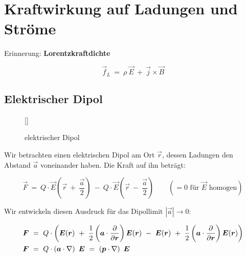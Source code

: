 \chapter{Kraftwirkung auf Ladungen und Ströme}

Erinnerung: \textbf{Lorentzkraftdichte}

\begin{equation*}
\vec{f}_L \ = \ \rho \ \vec{E} \ + \ \vec{j}\times\vec{B}
\end{equation*}

\section{Elektrischer Dipol}
\begin{wrapfigure}[12]{l}[0cm]{0cm}
	\raisebox{0pt}[\dimexpr{}\baselineskip\relax]{
		\colorbox{hgrey}{
		}
	}
	\caption{elektrischer Dipol}
\end{wrapfigure}
Wir betrachten einen elektrischen Dipol am Ort $\vec{r}$, dessen Ladungen den Abstand $\vec{a}$ voneinander haben. Die Kraft auf ihn beträgt:

\begin{equation*}
\vec{F} \ = \ Q \cdot \vec{E}\left(\vec{r} \ + \ \frac{\vec{a}}{2}\right) \ - \ Q \cdot\vec{E} \left(\vec{r} \ - \ \frac{\vec{a}}{2}\right) \qquad (=0 \text{ für $\vec{E}$ homogen})
\end{equation*}

Wir entwickeln diesen Ausdruck für das Dipollimit $|\vec{a}| \rightarrow 0$:

\begin{align*}
\vec{F}  \ &= \ Q \cdot \left( \vec{E} (\vec{r}) \ + \ \frac{1}{2} \left(\vec{a}\cdot\pdiff{}{\vec{r}}\right) \vec{E}(\vec{r}) \ - \ \vec{E}(\vec{r}) \ + \ \frac{1}{2} \left(\vec{a}\cdot\pdiff{}{\vec{r}}\right)\vec{E}(\vec{r})\right) \\
\vec{F} \ &= \ Q\cdot \left(\vec{a}\cdot\nabla\right) \ \vec{E}  \ = \ \left( \vec{p} \cdot \nabla\right) \ \vec{E}
\end{align*}

